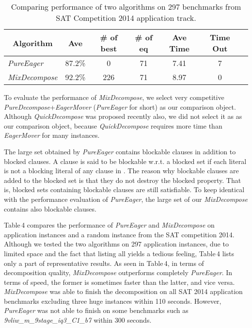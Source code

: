 \documentclass{llncs}
\begin{document}
\begin{table}
\caption{Comparing performance of two algorithms on 297 benchmarks
from SAT Competition 2014 application track.}
\begin{center}
\renewcommand{\arraystretch}{0.95}
\setlength\tabcolsep{4pt}
\begin{tabular}{|l|c|c|c|c|c|c|}
\hline  \hline
\multicolumn{1}{|c|}{Algorithm} & Ave  & \# of best & \# of eq & Ave Time & Time Out \\
\hline
\emph{PureEager} &  87.2\% & 0 & 71 & 7.41 & 7 \\
\hline
\emph{MixDecompose} &  92.2\% &226 & 71 & 8.97 & 0 \\
 \hline
\end{tabular}
\end{center}
\end{table}


To evaluate the performance of \emph{MixDecompose}, we select very
competitive \emph{PureDecompose}+\emph{EagerMover} (\emph{PureEager}
for short) \cite{web:14,EagerMover:14} as our comparison object.
Although \emph{QuickDecompose} \cite{sbliter:13} was proposed
recently also,  we did not select it as as our comparison object,
because \emph{QuickDecompose} requires more time than
 \emph{EagerMover} for many instances.

   The large set  obtained by \emph{PureEager} contains blockable clauses in addition to
 blocked clauses. A clause  is said to be blockable w.r.t. a blocked set 
 if each literal  is not a blocking literal of any clause in .
The reason why blockable clauses are added to the blocked set is
that they do not destroy the blocked property. That is, blocked sets
containing blockable clauses are still satisfiable. To keep
identical with the performance evaluation
  of \emph{PureEager}, the large set  of our
  \emph{MixDecompose} contains also blockable clauses.

Table\,4 compares the performance of \emph{PureEager} and
\emph{MixDecompose} on application instances and a random instance
from the SAT competition 2014. Although we tested the two algorithms
on 297 application instances,  due to limited space and the fact
that listing all yields a tedious feeling, Table\,4 lists only a
part of representative results.  As seen in Table\,4, in terms of
decomposition quality, \emph{MixDecompose} outperforms completely
\emph{PureEager}.  In terms of speed, the former
 is sometimes faster than the latter, and vice versa. \emph{MixDecompose}
 was able to finish the decomposition on all SAT 2014 application
 benchmarks excluding three huge instances within 110 seconds.
 However, \emph{PureEager} was not able to finish on some
 benchmarks such as \emph{9vliw\_m\_9stage\_iq3\_C1\_b7} within 300
 seconds.
\end{document}

